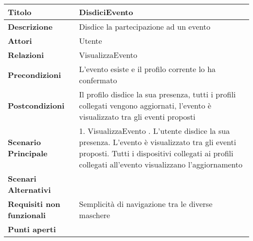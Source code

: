 \begin{tabular} {|P{4.5cm}|P{12.5cm}|}
  \hline
  \textbf{Titolo}                   & DisdiciEvento                                                                                                                     \\
  \hline
  \textbf{Descrizione}              & Disdice la partecipazione ad un evento                                                                                            \\
  \hline
  \textbf{Attori}                   & Utente                                                                                                                            \\
  \hline
  \textbf{Relazioni}                & VisualizzaEvento                                                                                                                  \\
  \hline
  \textbf{Precondizioni}            & L'evento esiste e il profilo corrente lo ha confermato                                                                            \\
  \hline
  \textbf{Postcondizioni}           & Il profilo disdice la sua presenza, tutti i profili collegati vengono aggiornati, l'evento è visualizzato tra gli eventi proposti \\
  \hline
  \textbf{Scenario Principale}      & 1. VisualizzaEvento . L'utente disdice la sua presenza. L'evento è visualizzato tra gli eventi proposti. Tutti i dispositivi collegati ai profili collegati all'evento visualizzano l'aggiornamento                                                                         \\
  \textbf{Scenari Alternativi}      &                                                                                                                                   \\
  \hline
  \textbf{Requisiti non funzionali} & Semplicità di navigazione tra le diverse maschere                                                                                 \\
  \hline
  \textbf{Punti aperti}             &                                                                                                                                   \\
  \hline
\end{tabular}
\hfill
\break

